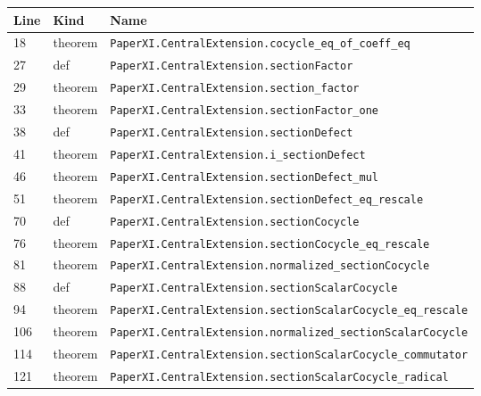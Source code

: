 \documentclass[10pt,oneside]{book}
\begin{document}
\begin{longtable}{@{}p{}p{}p{}@{}}\toprule Line&Kind&Name\\\midrule\endhead

18&theorem&\nolinkurl{PaperXI.CentralExtension.cocycle_eq_of_coeff_eq}\\

27&def&\nolinkurl{PaperXI.CentralExtension.sectionFactor}\\

29&theorem&\nolinkurl{PaperXI.CentralExtension.section_factor}\\

33&theorem&\nolinkurl{PaperXI.CentralExtension.sectionFactor_one}\\

38&def&\nolinkurl{PaperXI.CentralExtension.sectionDefect}\\

41&theorem&\nolinkurl{PaperXI.CentralExtension.i_sectionDefect}\\

46&theorem&\nolinkurl{PaperXI.CentralExtension.sectionDefect_mul}\\

51&theorem&\nolinkurl{PaperXI.CentralExtension.sectionDefect_eq_rescale}\\

70&def&\nolinkurl{PaperXI.CentralExtension.sectionCocycle}\\

76&theorem&\nolinkurl{PaperXI.CentralExtension.sectionCocycle_eq_rescale}\\

81&theorem&\nolinkurl{PaperXI.CentralExtension.normalized_sectionCocycle}\\

88&def&\nolinkurl{PaperXI.CentralExtension.sectionScalarCocycle}\\

94&theorem&\nolinkurl{PaperXI.CentralExtension.sectionScalarCocycle_eq_rescale}\\

106&theorem&\nolinkurl{PaperXI.CentralExtension.normalized_sectionScalarCocycle}\\

114&theorem&\nolinkurl{PaperXI.CentralExtension.sectionScalarCocycle_commutator}\\

121&theorem&\nolinkurl{PaperXI.CentralExtension.sectionScalarCocycle_radical}\\


\end{longtable}
\end{document}
